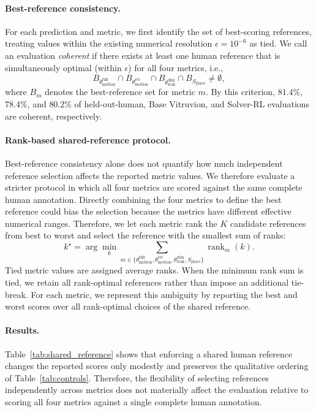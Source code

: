 \paragraph{Best-reference consistency.}
For each prediction and metric, we first identify the set of best-scoring references, treating values within the existing numerical
resolution $\epsilon=10^{-6}$ as tied.
We call an evaluation \emph{coherent} if there exists at least one human reference that is simultaneously optimal (within $\epsilon$) for all four metrics, i.e.,
\begin{equation}
B_{\theta_\mathrm{motion}^\mathrm{full}}\cap B_{\theta_\mathrm{motion}^\mathrm{rel}}\cap
B_{\theta_\mathrm{leak}^\mathrm{dim}}\cap B_{S_\mathrm{place}}\neq\emptyset,
\end{equation}
where $B_m$ denotes the best-reference set for metric $m$.
By this criterion, $81.4\%$, $78.4\%$, and $80.2\%$ of held-out-human, Base Vitruvion, and Solver-RL evaluations are coherent, respectively.

\paragraph{Rank-based shared-reference protocol.}
Best-reference consistency alone does not quantify how much independent reference selection affects the reported metric values. We therefore evaluate a stricter protocol in which all four metrics are scored against the same complete human annotation.
Directly combining the four metrics to define the best reference could bias the selection because the metrics have different effective numerical ranges. Therefore, we let each metric rank the $K$ candidate references from best to worst and select the reference with the smallest sum of ranks:
\begin{equation}
    k^\star =
    \arg\min_k
    \sum_{m \in
    \{\theta_\mathrm{motion}^\mathrm{full},\theta_\mathrm{motion}^\mathrm{rel},\theta_\mathrm{leak}^\mathrm{dim},S_\mathrm{place}\}}
    \operatorname{rank}_m(k).
    \label{eq:shared_reference_rank}
\end{equation}
Tied metric values are assigned average ranks. When the minimum rank sum is tied, we retain all rank-optimal references rather than impose an additional tie-break. For each metric, we represent this ambiguity by reporting the best and worst scores over all rank-optimal choices of the shared reference.

\paragraph{Results.}
Table~\ref{tab:shared_reference} shows that enforcing a shared human reference changes the reported scores only modestly and preserves the qualitative ordering of Table~\ref{tab:controls}.
Therefore, the flexibility of selecting references independently across metrics does not materially affect the evaluation relative to scoring all four metrics against a single complete human annotation.

